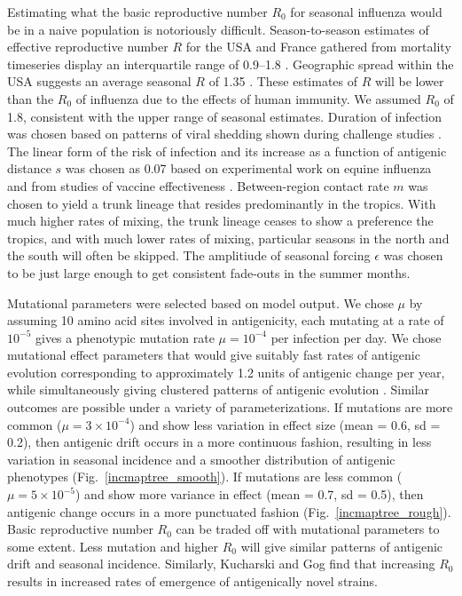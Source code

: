 \documentclass[11pt,oneside,letterpaper]{article}
\begin{document}
Estimating what the basic reproductive number $R_0$ for seasonal influenza would be in a naive population is notoriously difficult.  Season-to-season estimates of effective reproductive number $R$ for the USA and France gathered from mortality timeseries display an interquartile range of 0.9--1.8 \cite{Chowell08}.  Geographic spread within the USA suggests an average seasonal $R$ of 1.35 \cite{Viboud06}.  These estimates of $R$ will be lower than the $R_0$ of influenza due to the effects of human immunity.  We assumed $R_0$ of 1.8, consistent with the upper range of seasonal estimates.  Duration of infection was chosen based on patterns of viral shedding shown during challenge studies \cite{Carrat08}.  The linear form of the risk of infection and its increase as a function of antigenic distance $s$ was chosen as 0.07 based on experimental work on equine influenza \cite{Park09} and from studies of vaccine effectiveness \cite{Gupta06}.  Between-region contact rate $m$ was chosen to yield a trunk lineage that resides predominantly in the tropics.  With much higher rates of mixing, the trunk lineage ceases to show a preference the tropics, and with much lower rates of mixing, particular seasons in the north and the south will often be skipped.  The amplitiude of seasonal forcing $\epsilon$ was chosen to be just large enough to get consistent fade-outs in the summer months.

Mutational parameters were selected based on model output.  We chose $\mu$ by assuming 10 amino acid sites involved in antigenicity, each mutating at a rate of $10^{-5}$ \cite{Rambaut08} gives a phenotypic mutation rate $\mu = 10^{-4}$ per infection per day.  We chose mutational effect parameters that would give suitably fast rates of antigenic evolution corresponding to approximately 1.2 units of antigenic change per year, while simultaneously giving clustered patterns of antigenic evolution  \cite{Smith04}.  Similar outcomes are possible under a variety of parameterizations.  If mutations are more common ($\mu = 3 \times 10^{-4}$) and show less variation in effect size (mean = 0.6, sd = 0.2), then antigenic drift occurs in a more continuous fashion, resulting in less variation in seasonal incidence and a smoother distribution of antigenic phenotypes (Fig.~\ref{incmaptree_smooth}).  If mutations are less common ($\mu = 5 \times 10^{-5}$) and show more variance in effect (mean = 0.7, sd = 0.5), then antigenic change occurs in a more punctuated fashion (Fig.~\ref{incmaptree_rough}).  Basic reproductive number $R_0$ can be traded off with mutational parameters to some extent.  Less mutation and higher $R_0$ will give similar patterns of antigenic drift and seasonal incidence.  Similarly, Kucharski and Gog \cite{Kucharski11} find that increasing $R_0$ results in increased rates of emergence of antigenically novel strains.
\end{document}
